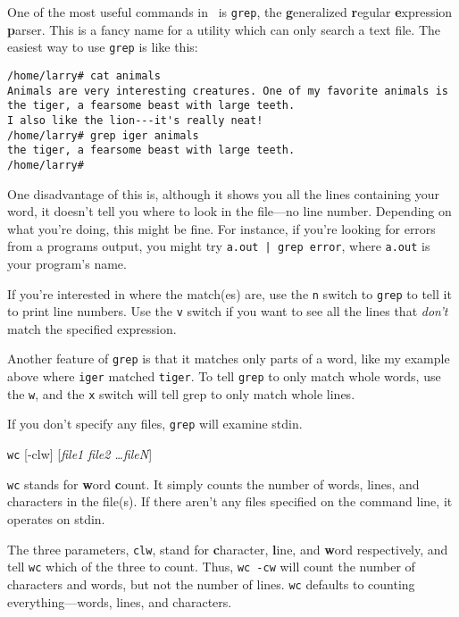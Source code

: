 One of the most useful commands in \unix\ is {\tt grep}, the
{\bf g}eneralized {\bf r}egular {\bf e}xpression {\bf p}arser. This is
a fancy name for a utility which can only search a text file.  The
easiest way to use {\tt grep} is like this:

\begin{screen}\begin{verbatim}
/home/larry# cat animals
Animals are very interesting creatures. One of my favorite animals is
the tiger, a fearsome beast with large teeth.
I also like the lion---it's really neat!
/home/larry# grep iger animals
the tiger, a fearsome beast with large teeth.
/home/larry#
\end{verbatim}\end{screen}

One disadvantage of this is, although it shows you all the lines
containing your word, it doesn't tell you where to look in the
file---no line number. Depending on what you're doing, this might be
fine. For instance, if you're looking for errors from a programs
output, you might try {\tt a.out | grep error}, where {\tt a.out} is
your program's name.

If you're interested in where the match(es) are, use the {\tt n}
switch to {\tt grep} to tell it to print line numbers. Use the {\tt v}
switch if you want to see all the lines that {\em don't\/} match the
specified expression.

Another feature of {\tt grep} is that it matches only parts of a word,
like my example above where {\tt iger} matched {\tt tiger}. To tell
{\tt grep} to only match whole words, use the {\tt w}, and the {\tt x}
switch will tell grep to only match whole lines.

If you don't specify any files, {\tt grep} will examine stdin.

\begin{command}
  {\tt wc} [-clw] [{\sl file1 file2 \ldots fileN\/}]
\end{command}

{\tt wc} stands for {\bf w}ord {\bf c}ount. It simply counts the
number of words, lines, and characters in the file(s). If there aren't
any files specified on the command line, it operates on stdin.

The three parameters, {\tt clw}, stand for {\bf c}haracter, {\bf
  l}ine, and {\bf w}ord respectively, and tell {\tt wc} which of the
three to count. Thus, {\tt wc -cw} will count the number of characters
and words, but not the number of lines. {\tt wc} defaults to counting
everything---words, lines, and characters.

